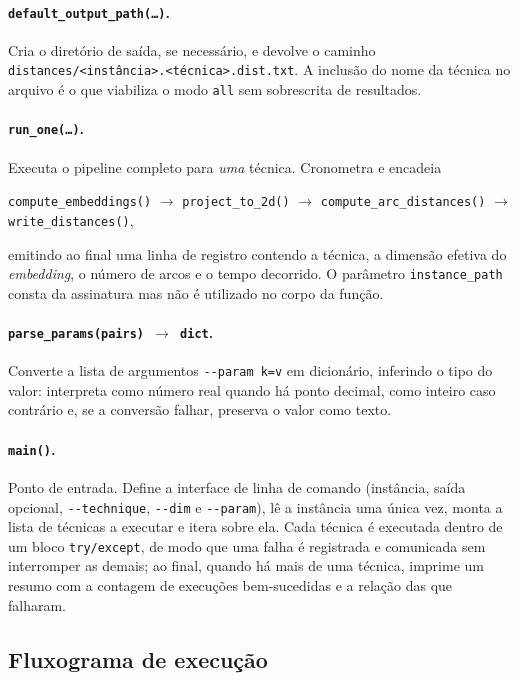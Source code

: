 \documentclass[12pt,a4paper]{article}
\begin{document}
\paragraph{\texttt{default\_output\_path(\ldots)}.}
Cria o diretório de saída, se necessário, e devolve o caminho
\texttt{distances/<instância>.<técnica>.dist.txt}. A inclusão do nome da
técnica no arquivo é o que viabiliza o modo \texttt{all} sem
sobrescrita de resultados.

\paragraph{\texttt{run\_one(\ldots)}.}
Executa o pipeline completo para \emph{uma} técnica. Cronometra e encadeia
%
\begin{center}\small
\texttt{compute\_embeddings()} $\rightarrow$ \texttt{project\_to\_2d()}
$\rightarrow$ \texttt{compute\_arc\_distances()} $\rightarrow$
\texttt{write\_distances()},
\end{center}
%
emitindo ao final uma linha de registro contendo a técnica, a dimensão
efetiva do \textit{embedding}, o número de arcos e o tempo decorrido. O parâmetro \texttt{instance\_path} consta da assinatura
mas não é utilizado no corpo da função.

\paragraph{\texttt{parse\_params(pairs) $\rightarrow$ dict}.}
Converte a lista de argumentos \texttt{-{}-param k=v} em dicionário,
inferindo o tipo do valor: interpreta como número real quando há ponto
decimal, como inteiro caso contrário e, se a conversão falhar, preserva
o valor como texto.

\paragraph{\texttt{main()}.}
Ponto de entrada. Define a interface de linha de comando (instância,
saída opcional, \texttt{-{}-technique}, \texttt{-{}-dim} e
\texttt{-{}-param}), lê a instância uma única vez, monta a lista de
técnicas a executar e itera sobre ela. Cada técnica é executada dentro de
um bloco \texttt{try/except}, de modo que uma falha é registrada e
comunicada sem interromper as demais; ao final, quando há mais de uma
técnica, imprime um resumo com a contagem de execuções bem-sucedidas e a
relação das que falharam.

\subsection{Fluxograma de execução}
\end{document}
